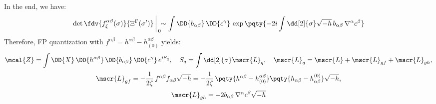 \documentclass[a4paper,10pt]{article}
\begin{document}
\begin{itemize}
	In the end, we have:
	\begin{equation}
		\det \fdv{f^{\alpha\beta}_\xi(\sigma)}
			{\Xi^\Gamma(\sigma')}\,
			\bigg|_{\,0} \!\!
		\sim \int
			\DD{b_{\alpha\beta}}\,
			\DD{c^\gamma}\,
			\exp \pqty{
				-2i\int \dd[2]{\sigma}
				\sqrt{-h}\,
				b_{\alpha\beta}\,
				\nabla^\alpha c^\beta
			}
	\end{equation}
	Therefore, FP quantization with $
		f^{\alpha\beta}
		= h^{\alpha\beta} - h^{\alpha\beta}_{(0)}
	$ yields:
	\begin{gather}
		\mcal{Z}
		= \int \DD{X}\,\DD{h^{\alpha\beta}}\,
			\DD{b_{\alpha\beta}}\,\DD{c^\gamma}\,
			e^{iS_{q}},\quad
		S_q = \int \dd[2]{\sigma} \mscr{L}_q,\quad
		\mscr{L}_q
		= \mscr{L} + \mscr{L}_{gf} + \mscr{L}_{gh},
		\\[.5ex]
		\mscr{L}_{gf}
		= -\frac{1}{2\zeta}\,
			f^{\alpha\beta}
			f_{\alpha\beta} \sqrt{-h}
		= -\frac{1}{2\zeta}\,\pqty{
				h^{\alpha\beta}
				- h^{\alpha\beta}_{(0)}
			} \pqty{
				h_{\alpha\beta}
				- h_{\alpha\beta}^{(0)}
			} \sqrt{-h},\\[.5ex]
		\mscr{L}_{gh}
		= -2b_{\alpha\beta}\,
			\nabla^\alpha c^\beta \sqrt{-h}
	\end{gather}
	\qedfull
	\end{itemize}

\printbibliography[%
	,heading = bibintoc
]
\end{document}
